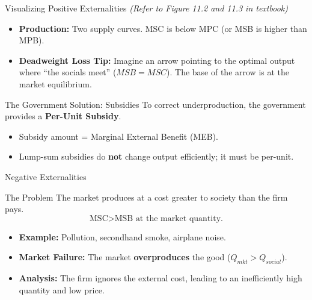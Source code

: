 \documentclass{beamer}
\begin{document}
\begin{frame}{Visualizing Positive Externalities}
    \textit{(Refer to Figure 11.2 and 11.3 in textbook)}

    \begin{itemize}
        \item \textbf{Production:} Two supply curves. MSC is below MPC (or MSB is higher than MPB).
        \item \textbf{Deadweight Loss Tip:} Imagine an arrow pointing to the optimal output where ``the socials meet'' ($MSB = MSC$). The base of the arrow is at the market equilibrium.
    \end{itemize}

    \begin{block}{The Government Solution: Subsidies}
        To correct underproduction, the government provides a \textbf{Per-Unit Subsidy}.
        \begin{itemize}
            \item Subsidy amount = Marginal External Benefit (MEB).
            \item Lump-sum subsidies do \textbf{not} change output efficiently; it must be per-unit.
        \end{itemize}
    \end{block}
\end{frame}

\begin{frame}{Negative Externalities}
    \begin{alertblock}{The Problem}
        The market produces at a cost greater to society than the firm pays.
        \[ \text{MSC} > \text{MSB} \text{ at the market quantity.} \]
    \end{alertblock}

    \begin{itemize}
        \item \textbf{Example:} Pollution, secondhand smoke, airplane noise.
        \item \textbf{Market Failure:} The market \textbf{overproduces} the good ($Q_{mkt} > Q_{social}$).
        \item \textbf{Analysis:} The firm ignores the external cost, leading to an inefficiently high quantity and low price.
    \end{itemize}
\end{frame}
\end{document}

